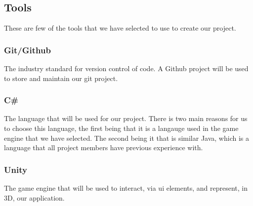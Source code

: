 \subsection{Tools}
These are few of the tools that we have selected to use to create our project.

\subsubsection{Git/Github}
The industry standard for version control of code. 
A Github project will be used to store and maintain our git project.

\subsubsection{C\#}
The language that will be used for our project. 
There is two main reasons for us to choose this language, the first being that it is a langauge used in the game engine that we have selected. 
The second being it that is similar Java, which is a language that all project members have previous experience with.

\subsubsection{Unity}
The game engine that will be used to interact, via ui elements, and represent, in 3D, our application. 